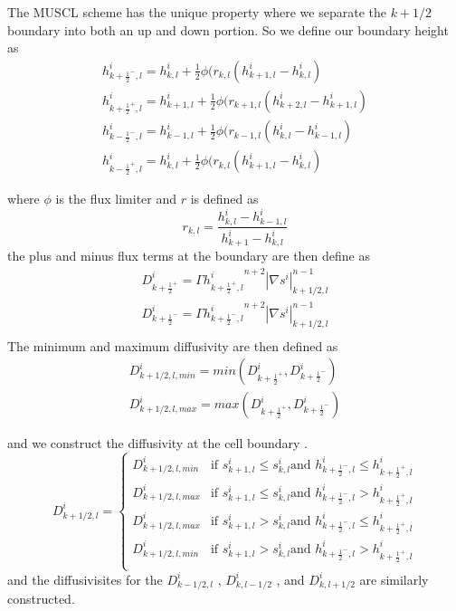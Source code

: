 \documentclass{article}
\begin{document}
The MUSCL scheme has the unique property where we separate the $k+1/2$ boundary into both an up and down portion. So we define our boundary height as 
\begin{subequations}
\begin{gather}
h^i_{k+\frac{1}{2}^-,l} = h^i_{k,l} + \frac{1}{2}\phi(r_{k,l}(h^i_{k+1,l}-h^i_{k,l})\\
h^i_{k+\frac{1}{2}^+,l} = h^i_{k+1,l} + \frac{1}{2}\phi(r_{k+1,l}(h^i_{k+2,l}-h^i_{k+1,l})\\
h^i_{k-\frac{1}{2}^-,l} = h^i_{k-1,l} + \frac{1}{2}\phi(r_{k-1,l}(h^i_{k,l}-h^i_{k-1,l})\\
h^i_{k-\frac{1}{2}^+,l} = h^i_{k,l} + \frac{1}{2}\phi(r_{k,l}(h^i_{k+1,l}-h^i_{k,l})
\end{gather}
\end{subequations}

where $\phi$ is the flux limiter and $r$ is defined as
\begin{equation}
r_{k,l} = \frac{h^i_{k,l}-h^i_{k-1,l}}{h^i_{k+1}-h^i_{k,l}}
\end{equation}
the plus and minus flux terms at the boundary are then define as
\begin{subequations}
\begin{gather}
D^i_{k+\frac{1}{2}^+} = \Gamma {h^i_{k+\frac{1}{2}^+,l}}^{n+2}|\nabla s^i|^{n-1}_{k+1/2,l}\\
D^i_{k+\frac{1}{2}^-} = \Gamma {h^i_{k+\frac{1}{2}^-,l}}^{n+2}|\nabla s^i|^{n-1}_{k+1/2,l}\\
\end{gather}
\end{subequations}
The minimum and maximum diffusivity are then defined as 
\begin{subequations}
\begin{gather}
D^i_{k+1/2,l,min} = min(D^i_{k+\frac{1}{2}^+}, D^i_{k+\frac{1}{2}^-} )\\
 D^i_{k+1/2,l,max}  = max(D^i_{k+\frac{1}{2}^+}, D^i_{k+\frac{1}{2}^-})
\end{gather}
\end{subequations}


and we construct the diffusivity at the cell boundary \cite{Jarosch2013}.
\begin{equation}
    D^i_{k+1/2,l}= 
\begin{cases}
    D^i_{k+1/2,l,min}& \text{if } s^i_{k+1,l} \leq s^i_{k,l} \text{and } h^i_{k+\frac{1}{2}^-,l} \leq h^i_{k+\frac{1}{2}^+,l}\\
    D^i_{k+1/2,l,max}              & \text{if }  s^i_{k+1,l} \leq s^i_{k,l} \text{and } h^i_{k+\frac{1}{2}^-,l} > h^i_{k+\frac{1}{2}^+,l}\\
    D^i_{k+1/2,l,max}& \text{if } s^i_{k+1,l} > s^i_{k,l} \text{and } h^i_{k+\frac{1}{2}^-,l} \leq h^i_{k+\frac{1}{2}^+,l}\\
    D^i_{k+1/2,l,min}              & \text{if }  s^i_{k+1,l} > s^i_{k,l} \text{and } h^i_{k+\frac{1}{2}^-,l} > h^i_{k+\frac{1}{2}^+,l}\\
\end{cases}
\end{equation}
and the diffusivisites for the $D^i_{k-1/2,l}$ , $D^i_{k,l-1/2}$ , and $D^i_{k,l+1/2}$ are similarly constructed. 
\end{document}

